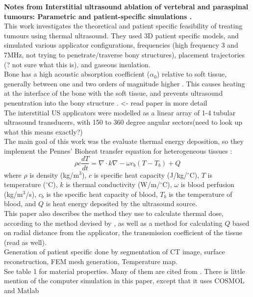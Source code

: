 \documentclass[11pt,titlepage]{article} %
\begin{document}
\textbf{Notes from Interstitial ultrasound ablation of vertebral and paraspinal tumours: Parametric and patient-specific simulations \cite{scott2014interstitial}.}\\
This work investigates the theoretical and patient specific feasibility of treating tumours using thermal ultrasound.
They used 3D patient specific models, and simulated various applicator configurations, frequencies (high frequency 3 and 7MHz, not trying to penetrate/traverse bony structures), placement trajectories (? not sure what this is), and gaseous insulation.\\
Bone has a high acoustic absorption coefficient ($\alpha_0$) relative to soft tissue, generally between one and two orders of magnitude higher \cite{duck1990physical}. This causes heating at the interface of the bone with the soft tissue, and prevents ultrasound penentration into the bony structure \cite{fujii1999study}. <- read paper in more detail\\
The interstitial US applicators were modelled as a linear array of 1-4 tubular ultrasound transducers, with 150 to 360 degree angular sectors(need to look up what this means exactly?)\\
The main goal of this work was the evaluate thermal energy deposition, so they implement the Pennes' Bioheat transfer equation for heterogeneous tissues \cite{pennes1948analysis}:
\begin{equation}
\rho c \frac{dT}{dt} = \nabla \cdot k \nabla - \omega c_b(T-T_b)+Q
\end{equation}
where $\rho$ is density (kg/m$^3$), $c$ is specific heat capacity (J/kg/$^{\circ}$C), $T$ is temperature ($^{\circ}$C), $k$ is thermal conductivity (W/m/$^{\circ}$C), $\omega$ is blood perfusion (kg/m$^3$/s), $c_b$ is the specific heat capacity of blood, $T_b$ is the temperature of blood, and $Q$ is heat energy deposited by the ultrasound source. \\
This paper also describes the method they use to calculate thermal dose, according to the method devised by \cite{sapareto1984thermal}, as well as a method for calculating $Q$ based on radial distance from the applicator, the transmission coefficient of the tissue (read \cite{scott2013interstitial} as well).\\
Generation of patient specific done by segmentation of CT image, surface reconstruction, FEM mesh generation, Temperature map.\\
See table 1 for material properties. Many of them are cited from \cite{duck1990physical}.
There is little mention of the computer simulation in this paper, except that it uses COSMOL and Matlab\\
\end{document}
